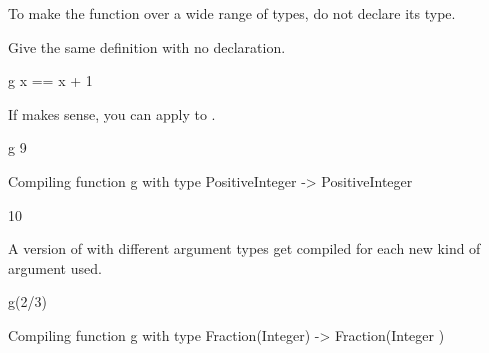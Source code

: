 To make the function over a wide range of types, do not
declare its type.
\begin{xtc}
\begin{xtccomment}
Give the same definition with no declaration.
\end{xtccomment}
\begin{spadsrc}
g x == x + 1 
\end{spadsrc}
\end{xtc}
\begin{xtc}
\begin{xtccomment}
If  makes sense, you can apply  to .
\end{xtccomment}
\begin{spadsrc}
g 9 
\end{spadsrc}
\begin{MessageOutput}
   Compiling function g with type PositiveInteger -> PositiveInteger 
\end{MessageOutput}
\begin{TeXOutput}
\begin{fricasmath}{5}
10%
\end{fricasmath}
\end{TeXOutput}
\end{xtc}
\begin{xtc}
\begin{xtccomment}
A version of  with different argument types
get compiled for each new kind of argument used.
\end{xtccomment}
\begin{spadsrc}
g(2/3)  
\end{spadsrc}
\begin{MessageOutput}
   Compiling function g with type Fraction(Integer) -> Fraction(Integer
      ) 
\end{MessageOutput}
\begin{TeXOutput}
\begin{fricasmath}{6}
%
\end{fricasmath}
\end{TeXOutput}
\end{xtc}
